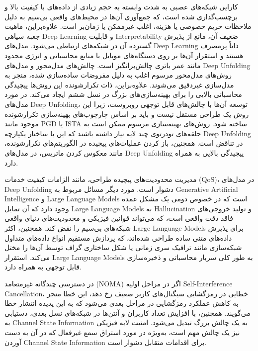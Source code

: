  کارایی شبکه‌های عصبی به شدت وابسته به حجم زیادی از داده‌های با کیفیت بالا و برچسب‌گذاری شده است، که جمع‌آوری آن‌ها در محیط‌های واقعی بی‌سیم به دلیل ملاحظات حریم خصوصی یا هزینه، اغلب غیرممکن یا زمان‌بر است. علاوه‌براین، ماهیت جعبه سیاهی 
\gls{Deep Learning}
  و قابلیت 
\gls{Interpretability}
   ضعیف آن، مانع از پذیرش گسترده آن در شبکه‌های ارتباطی می‌شود. مدل‌های 
\gls{Deep Learning}
  ذاتاً پرمصرف هستند و استقرار آن‌ها بر روی دستگاه‌های موبایل با منابع محاسباتی و انرژی محدود مانند عمر باتری چالش‌برانگیز است.
چالش‌های مدل‌محور و مدل‌های 
\gls{Deep Unfolding}
روش‌های مدل‌محور مرسوم اغلب به دلیل مفروضات ساده‌سازی شده، منجر به مدل‌سازی غیردقیق می‌شوند. علاوه‌براین، ذات تکرارشونده این روش‌ها پیچیدگی محاسباتی بالایی را برای بهینه‌سازی‌های بزرگ در نسل ششم ایجاد می‌کند. در مورد مدل‌های 
\gls{Deep Unfolding}،
 توسعه آن‌ها با چالش‌های قابل توجهی روبروست، زیرا این روش یک طراحی مستقل نیست و باید بر اساس چارچوب‌های بهینه‌سازی تکرارشونده موجود مانند 
\gls{PGD}
 یا 
\gls{ISTA}
 ساخته شود. روش‌های بهینه‌سازی مرسوم ممکن است به حلقه‌های تودرتوی چند لایه نیاز داشته باشند که این با ساختار یکپارچه 
\gls{Deep Unfolding}
  در تناقض است. همچنین، باز کردن عملیات‌های پیچیده در الگوریتم‌های تکرارشونده، مانند معکوس کردن ماتریس، در مدل‌های 
\gls{Deep Unfolding}
   پیچیدگی بالایی به همراه دارد. 
   
  مدیریت محدودیت‌های پیچیده طراحی، مانند الزامات کیفیت خدمات 
(\gls{QoS})،
   در مدل‌های 
\gls{Deep Unfolding}
    دشوار است. مورد دیگر مسائل مربوط به
\gls{Generative Artificial Intelligence}
و 
\glspl{Large Language Model}
است که در خصوص دومی یک مشکل عمده وجود دارد که آن تمایل
\glspl{Large Language Model}
به 
\gls{Hallucination}
 و تولید خروجی‌های فاقد دقت واقعی است، که می‌تواند قوانین فیزیکی و محدودیت‌های دنیای واقعی شبکه‌های بی‌سیم را نقض کند. همچنین، اکثر 
\glspl{Large Language Model}
  برای پذیرش داده‌های متنی ساده طراحی شده‌اند، که پردازش مستقیم انواع داده‌های متداول شبکه‌سازی مانند ترافیک سری زمانی یا شکل ساختاری گراف توسط آن‌ها را مختل می‌کند. استقرار 
\glspl{Large Language Model}
   به طور کلی سربار محاسباتی و ذخیره‌سازی قابل توجهی به همراه دارد.
   
در دسترسی چندگانه غیرمتعامد
(\gls{NOMA})
 اگر در مراحل اولیه 
\gls{Self-Interference Cancellation}،
 خطایی در رمزگشایی سیگنال‌های کاربر ضعیف رخ دهد، این خطا منجر به کاهش عملکرد رمزگشایی در مراحل بعدی می‌شود که به این پدیده انتشار خطا می‌گویند. همچنین، با افزایش تعداد کاربران و آنتن‌ها در شبکه‌های نسل بعدی، دستیابی به  
\gls{Channel State Information}
  به یک چالش بزرگ تبدیل می‌شود. امنیت لایه فیزیکی نیز یک چالش مهم است، به‌ویژه در مورد استراق سمع غیرفعال که در آن به دست آوردن
\gls{Channel State Information}
  برای اقدامات متقابل دشوار است.
  
